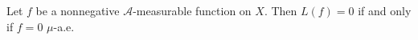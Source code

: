 Let $f$ be a nonnegative $\mathcal{A}$-measurable function on $X$. Then $L(f) = 0$ if and only if $f = 0$ $\mu$-a.e.